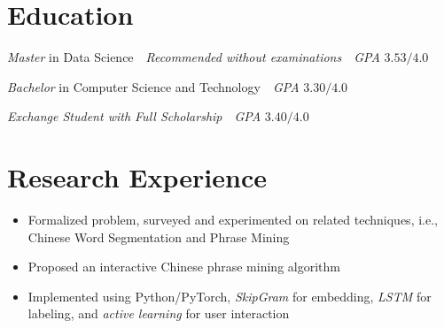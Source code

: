 \documentclass{resume}
\begin{document}



\linespread{0.95}

% 
% 

\section{Education}

\textit{Master} in Data Science\ \ \textit{Recommended without examinations}\ \ \textit{GPA} $3.53 / 4.0$\ \ 

\textit{Bachelor} in Computer Science and Technology\ \ \textit{GPA} $3.30 / 4.0$\ \ 

\textit{Exchange Student with Full Scholarship}\ \ \textit{GPA} $3.40 / 4.0$\ \

% 
% 

\section{Research Experience}

\begin{itemize}
  \item Formalized problem, surveyed and experimented on related techniques, i.e., Chinese Word Segmentation and Phrase Mining
  \item Proposed an interactive Chinese phrase mining algorithm
  \item Implemented using Python/PyTorch, \textit{SkipGram} for embedding, 
  \textit{LSTM} for labeling, and \textit{active learning} for user interaction
\end{itemize}
\end{document}
